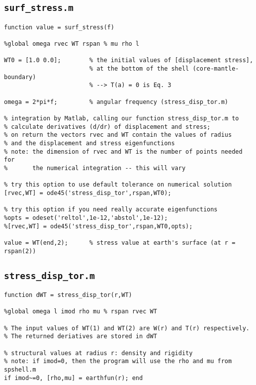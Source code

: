 \documentclass[11pt,titlepage,fleqn]{article}
\begin{document}
\begin{spacing}{1.0}

\subsection{\tt surf\_stress.m}
\label{sec:surf}

\small
\begin{verbatim}
function value = surf_stress(f)

%global omega rvec WT rspan % mu rho l

WT0 = [1.0 0.0];        % the initial values of [displacement stress],
                        % at the bottom of the shell (core-mantle-boundary)
                        % --> T(a) = 0 is Eq. 3

omega = 2*pi*f;         % angular frequency (stress_disp_tor.m)

% integration by Matlab, calling our function stress_disp_tor.m to
% calculate derivatives (d/dr) of displacement and stress;
% on return the vectors rvec and WT contain the values of radius
% and the displacement and stress eigenfunctions
% note: the dimension of rvec and WT is the number of points needed for
%       the numerical integration -- this will vary

% try this option to use default tolerance on numerical solution
[rvec,WT] = ode45('stress_disp_tor',rspan,WT0);

% try this option if you need really accurate eigenfunctions
%opts = odeset('reltol',1e-12,'abstol',1e-12);
%[rvec,WT] = ode45('stress_disp_tor',rspan,WT0,opts);

value = WT(end,2);      % stress value at earth's surface (at r = rspan(2))
\end{verbatim}
\normalsize


\pagebreak
\subsection{\tt stress\_disp\_tor.m}
\label{sec:stress}

\small
\begin{verbatim}
function dWT = stress_disp_tor(r,WT)

%global omega l imod rho mu % rspan rvec WT

% The input values of WT(1) and WT(2) are W(r) and T(r) respectively.
% The returned deriatives are stored in dWT

% structural values at radius r: density and rigidity
% note: if imod=0, then the program will use the rho and mu from spshell.m
if imod~=0, [rho,mu] = earthfun(r); end


\end{verbatim}
\end{spacing}
\end{document}

